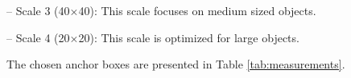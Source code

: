 \documentclass[preprint,review,12pt]{elsarticle}
\begin{document}
\noindent -- {Scale 3 (40×40):} This scale focuses on medium sized objects.

\noindent -- {Scale 4 (20×20):} This scale is optimized for large objects.









\noindent The chosen anchor boxes are presented in Table \ref{tab:measurements}.
\end{document}
